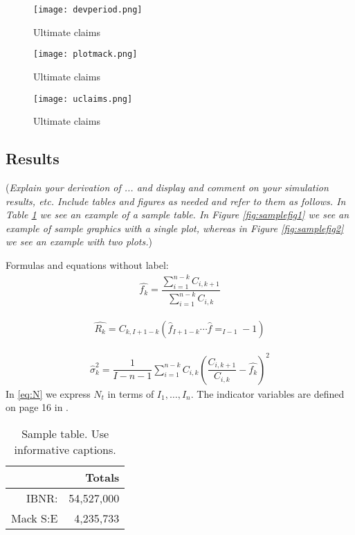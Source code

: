 \documentclass[a4paper]{article}
\begin{document}
 \begin{figure}[H]
 \center
  \texttt{[image: devperiod.png]}
  \caption{Ultimate claims}
  \label{fig:dev}
\end{figure}

 \begin{figure}[H]
 \center
  \texttt{[image: plotmack.png]}
  \caption{Ultimate claims}
  \label{fig:mack}
\end{figure}

 \begin{figure}[H]
 \center
  \texttt{[image: uclaims.png]}
  \caption{Ultimate claims}
  \label{fig:ultimate}
\end{figure}
\subsection*{Results}

({\it Explain your derivation of ... and display and comment on your simulation results, etc. Include tables and figures as needed and refer to them as follows. In Table \ref{tab:sampletab} we see an example of a sample table. In Figure \ref{fig:samplefig1} we see an example of sample graphics with a single plot, whereas in Figure \ref{fig:samplefig2} we see an example with two plots.}) 

Formulas and equations without label:
\begin{align*}
	\hat{f_k} = \dfrac{\sum_{i=1}^{n-k} C_{i,k+1}} {\sum_{i=1}^{n-k} C_{i,k}}
\end{align*}

\begin{align*}
	\hat{R_k} = C_{k,I+1-k} \left(  \hat{f}_{I+1-k} \cdots \hat{f}=_{I-1}-1\right)
\end{align*}

\begin{align}\label{eq:N}
	\hat{\sigma}_k^2 = \dfrac{1}{I-n-1} \sum_{i=1}^{n-k} C_{i,k}\left( \dfrac{ C_{i,k+1}}{ C_{i,k}} -\hat{f_k} \right)^2
\end{align}
In \eqref{eq:N} we express $N_t$ in terms of $I_1,\dots,I_n$. The indicator variables are defined on page 16 in \cite{Wuthrich-Merz-13}.

\begin{table}[!ht]
\center
\begin{tabular}{rr}
	& Totals \\ 
\hline
IBNR: & 54,527,000 \\
Mack S:E & 4,235,733\\
\hline
\end{tabular}
\caption{Sample table. Use informative captions.} \label{tab:sampletab}
\end{table}
\end{document}
